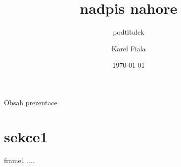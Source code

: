 \documentclass{beamer}
\title[nadpis dole]{nadpis nahore}
\subtitle[nadpis dole 2]{podtitulek}
\author[Karel Fiala]{Karel Fiala}
\institute[ČVUT FIT]{
   Fakulta informačních technologií \\
   České vysoké učení technické v~Praze
 }
\date{\today}
\begin{document}
\begin{frame}
   \titlepage
\end{frame}


\begin{frame}{Obsah prezentace}
   \tableofcontents
\end{frame}


\section{sekce1}
\begin{frame}{frame1}
....
\end{frame}







\end{document}
